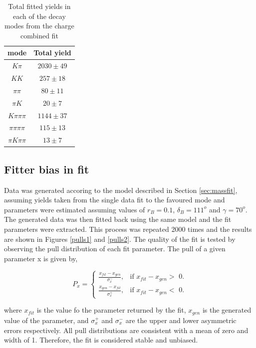 \begin{table}
\centering
\begin{tabular}{c|c}
\hline
\D mode & Total yield \\
\hline
$K\pi$ & $2030 \pm 49$ \\
$KK$ & $257 \pm 18$ \\
$\pi\pi$ & $80 \pm 11$ \\
$\pi K$ & $20 \pm 7$ \\
$K\pi\pi\pi$ & $1144 \pm 37$ \\
$\pi\pi\pi\pi$ & $115 \pm 13$ \\
$\pi K\pi\pi$ & $13 \pm 7$ \\
\hline
\end{tabular}
\caption{Total fitted yields in each of the \D decay modes from the charge combined fit}
\label{fittedyields}
\end{table}



\subsection{Fitter bias in \CP fit}

Data was generated accoring to the model described in Section \ref{sec:massfit}, assuming yields taken from the single data fit to the favoured mode and \CP parameters were estimated assuming values of $r_B = 0.1$, $\delta_B = 111^o$ and $\gamma = 70^o$. The generated data was then fitted back using the same model and the fit parameters were extracted. This process was repeated 2000 times and the results are shown in Figures \ref{pulls1} and \ref{pulls2}. The quality of the fit is tested by observing the pull distribution of each fit parameter. The pull of a given parameter x is given by,

\begin{equation*}
P_x = \begin{cases}
	\frac{x_{fit} - x_{gen}}{\sigma_x^-}, & \text{if $x_{fit} - x_{gen} >$ 0}. \\
	\frac{x_{gen} - x_{fit}}{\sigma_x^+}, & \text{if $x_{fit} - x_{gen} <$ 0}.
	\end{cases}
\end{equation*}

where $x_{fit}$ is the value fo the parameter returned by the fit, $x_{gen}$ is the generated value of the parameter, and $\sigma_x^+$ and $\sigma_x^-$ are the upper and lower asymmetric errors respectively. All pull distributions are consistent with a mean of zero and width of 1. Therefore, the fit is considered stable and unbiased.
 
